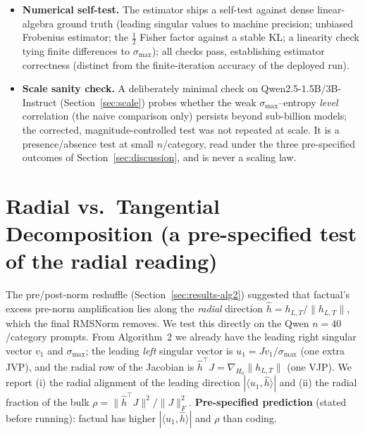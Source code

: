 \documentclass{article}
\begin{document}
\begin{itemize}
  differs between them (factual leads only pre-norm); a direct test (Appendix~\ref{sec:radial})
  \emph{refutes} a radial-component reading --- the leading amplification is tangential --- so this is
  the final-norm gain. The output-distribution ordering $\chi_F^{\max}$ is identical at both
  sites (it depends on the logits, not the tracked hidden index).
  \item \textbf{Numerical self-test.} The estimator ships a self-test against dense linear-algebra
  ground truth (leading singular values to machine precision; unbiased Frobenius estimator; the
  $\tfrac12$ Fisher factor against a stable KL; a linearity check tying finite differences to
  $\sigma_{\max}$); all checks pass, establishing estimator correctness (distinct from the
  finite-iteration accuracy of the deployed run).
  \item \textbf{Scale sanity check.} A deliberately minimal check on Qwen2.5-1.5B/3B-Instruct
  (Section~\ref{sec:scale}) probes whether the weak $\sigma_{\max}$--entropy \emph{level} correlation
  (the naive comparison only) persists beyond sub-billion models; the corrected,
  magnitude-controlled test was not repeated at scale. It is a presence/absence test at small
  $n$/category, read under the three pre-specified outcomes of Section~\ref{sec:discussion}, and is
  never a scaling law.
\end{itemize}

\section{Radial vs.\ Tangential Decomposition (a pre-specified test of the radial reading)}
\label{sec:radial}
The pre/post-norm reshuffle (Section~\ref{sec:results-alg2}) suggested that factual's excess pre-norm
amplification lies along the \emph{radial} direction $\hat h=h_{L,T}/\|h_{L,T}\|$, which the final
RMSNorm removes. We test this directly on the Qwen $n=40$/category prompts. From Algorithm~2 we already
have the leading right singular vector $v_1$ and $\sigma_{\max}$; the leading \emph{left} singular
vector is $u_1=Jv_1/\sigma_{\max}$ (one extra JVP), and the radial row of the Jacobian is
$\hat h^\top J=\nabla_{H_0}\|h_{L,T}\|$ (one VJP). We report (i) the radial alignment of the leading
direction $|\langle u_1,\hat h\rangle|$ and (ii) the radial fraction of the bulk
$\rho=\|\hat h^\top J\|^2/\|J\|_F^2$. \textbf{Pre-specified prediction} (stated before running):
factual has higher $|\langle u_1,\hat h\rangle|$ and $\rho$ than coding.
\end{document}
